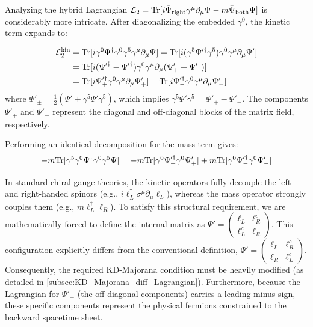 Analyzing the hybrid Lagrangian $\mathcal{L}_2={\rm Tr}[ i\bar\Psi_{\text{right}}\gamma^\mu\partial_\mu\Psi-m\bar\Psi_{\text{both}}\Psi]$ is considerably more intricate. After diagonalizing the embedded $\gamma^0$, the kinetic term expands to: 

\begin{equation}
\begin{aligned}
    \mathcal{L}_2^{\text{kin}}&={\rm Tr}[ i\gamma^0\Psi^\dagger\gamma^0\gamma^5\gamma^\mu\partial_\mu\Psi]={\rm Tr}[ i(\gamma^5\Psi'^\dagger\gamma^5)\gamma^0\gamma^\mu\partial_\mu\Psi']\\
    &={\rm Tr}[ i(\Psi_+'^\dagger-\Psi_-'^\dagger)\gamma^0\gamma^\mu\partial_\mu(\Psi_+'+\Psi'_-)]\\
    &={\rm Tr}[ i\Psi_+'^\dagger\gamma^0\gamma^\mu\partial_\mu\Psi_+']-{\rm Tr}[ i\Psi_-'^\dagger\gamma^0\gamma^\mu\partial_\mu\Psi_-']
\end{aligned}
\end{equation}
where $\Psi'_\pm=\frac{1}{2}(\Psi'\pm\gamma^5\Psi'\gamma^5)$, which implies $\gamma^5\Psi'\gamma^5=\Psi'_+-\Psi'_-$. The components $\Psi'_+$ and $\Psi'_-$ represent the diagonal and off-diagonal blocks of the matrix field, respectively. 

Performing an identical decomposition for the mass term gives: 
\begin{equation}
    -m{\rm Tr}[ \gamma^5\gamma^0\Psi^\dagger\gamma^0\gamma^5\Psi]=-m{\rm Tr}[\gamma^0\Psi_+'^\dagger\gamma^0\Psi_+']+m{\rm Tr}[\gamma^0\Psi_-'^\dagger\gamma^0\Psi_-']
\end{equation}

In standard chiral gauge theories, the kinetic operators fully decouple the left- and right-handed spinors (e.g., $i\ell_L^\dagger\bar\sigma^\mu\partial_\mu\ell_L$), whereas the mass operator strongly couples them (e.g., $m\ell_L^\dagger\ell_R$). To satisfy this structural requirement, we are mathematically forced to define the internal matrix as $\Psi'=\begin{pmatrix} \ell_L&\ell_R^c\\ \ell_L^c & \ell_R\end{pmatrix}$. This configuration explicitly differs from the conventional definition, $\Psi'=\begin{pmatrix} \ell_L&\ell_R^c\\  \ell_R&\ell_L^c\end{pmatrix}$. Consequently, the required KD-Majorana condition must be heavily modified (as detailed in \cref{subsec:KD_Majorana_diff_Lagrangian}). Furthermore, because the Lagrangian for $\Psi'_-$ (the off-diagonal components) carries a leading minus sign, these specific components represent the physical fermions constrained to the backward spacetime sheet. 

